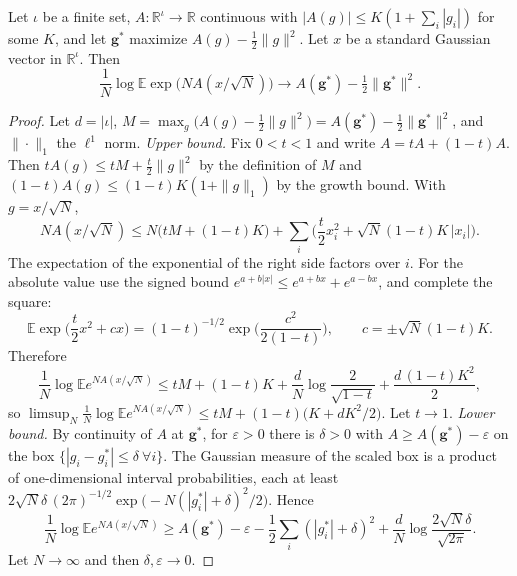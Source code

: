 \begin{lemma}\label{lem:sg-tal:replica-laplace}
\leanok
{}
Let $\iota$ be a finite set, $A:\mathbb R^\iota\to\mathbb R$ continuous with $|A(g)|\le K(1+\sum_i|g_i|)$ for some $K$, and let $\mathbf g^*$ maximize $A(g)-\frac12\|g\|^2$.
Let $x$ be a standard Gaussian vector in $\mathbb R^\iota$. Then
\[
\frac1N\log\mathbb E\exp\bigl(NA(x/\sqrt N)\bigr)\longrightarrow A(\mathbf g^*)-\tfrac12\|\mathbf g^*\|^2 .
\]
\end{lemma}
\begin{proof}
\leanok
Let $d=|\iota|$, $M=\max_g\big(A(g)-\frac12\|g\|^2\big)=A(\mathbf g^*)-\frac12\|\mathbf g^*\|^2$, and $\|\cdot\|_1$ the $\ell^1$ norm.
\emph{Upper bound.} Fix $0<t<1$ and write $A=tA+(1-t)A$. Then $tA(g)\le tM+\frac t2\|g\|^2$ by the definition of $M$ and $(1-t)A(g)\le(1-t)K(1+\|g\|_1)$ by the growth bound. With $g=x/\sqrt N$,
\[
NA(x/\sqrt N)\le N\big(tM+(1-t)K\big)+\sum_i\Big(\frac t2x_i^2+\sqrt N(1-t)K\,|x_i|\Big).
\]
The expectation of the exponential of the right side factors over $i$. For the absolute value use the signed bound $e^{a+b|x|}\le e^{a+bx}+e^{a-bx}$, and complete the square:
\[
\mathbb E\exp\Big(\frac t2x^2+cx\Big)=(1-t)^{-1/2}\exp\Big(\frac{c^2}{2(1-t)}\Big),\qquad c=\pm\sqrt N(1-t)K .
\]
Therefore
\[
\frac1N\log\mathbb E e^{NA(x/\sqrt N)}\le tM+(1-t)K+\frac{d}{N}\log\frac2{\sqrt{1-t}}+\frac{d\,(1-t)K^2}2 ,
\]
so $\limsup_N\frac1N\log\mathbb Ee^{NA(x/\sqrt N)}\le tM+(1-t)\big(K+dK^2/2\big)$. Let $t\to1$.
\emph{Lower bound.} By continuity of $A$ at $\mathbf g^*$, for $\varepsilon>0$ there is $\delta>0$ with $A\ge A(\mathbf g^*)-\varepsilon$ on the box $\{|g_i-g^*_i|\le\delta\ \forall i\}$. The Gaussian measure of the scaled box is a product of one-dimensional interval probabilities, each at least $2\sqrt N\delta\,(2\pi)^{-1/2}\exp\big(-N(|g^*_i|+\delta)^2/2\big)$. Hence
\[
\frac1N\log\mathbb Ee^{NA(x/\sqrt N)}\ge A(\mathbf g^*)-\varepsilon-\frac12\sum_i(|g^*_i|+\delta)^2+\frac dN\log\frac{2\sqrt N\delta}{\sqrt{2\pi}} .
\]
Let $N\to\infty$ and then $\delta,\varepsilon\to0$.
\end{proof}

